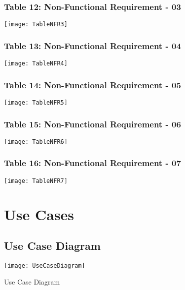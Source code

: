 \begin{figure}[h]
\subsubsection{Table 12: Non-Functional Requirement - 03}
\centering
\texttt{[image: TableNFR3]}
\end{figure}

\begin{figure}[h]
\subsubsection{Table 13: Non-Functional Requirement - 04}
\centering
\texttt{[image: TableNFR4]}
\end{figure}

\begin{figure}[h]
\subsubsection{Table 14: Non-Functional Requirement - 05}
\centering
\texttt{[image: TableNFR5]}
\end{figure}

\begin{figure}[h]
\subsubsection{Table 15: Non-Functional Requirement - 06}
\centering
\texttt{[image: TableNFR6]}
\end{figure}

\begin{figure}[h]
\subsubsection{Table 16: Non-Functional Requirement - 07}
\centering
\texttt{[image: TableNFR7]}
\end{figure}

\begin{figure}
\section{Use Cases}
\subsection{Use Case Diagram}
\center
\texttt{[image: UseCaseDiagram]}
\caption{Use Case Diagram}
\label{fig:UseCaseDiagram}
\end{figure}